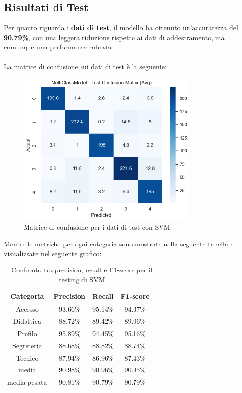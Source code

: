 \subsection{Risultati di Test}

Per quanto riguarda i \textbf{dati di test}, il modello ha ottenuto un'accuratezza del \textbf{90.79\%}, con una leggera riduzione rispetto ai dati di addestramento, ma comunque una performance robusta. \\ \\
La matrice di confusione sui dati di test è la seguente:

\begin{figure}[H]
    \centering
    \includegraphics[width=0.8\textwidth]{images/confusion_matrix_test_svm.png}
    \caption{Matrice di confusione per i dati di test con SVM}
    \label{fig:confusion_matrix_test_svm}
\end{figure}

Mentre le metriche per ogni categoria sono mostrate nella seguente tabella e visualizzate nel seguente grafico:

\begin{table}[H]
    \centering
    \begin{tabular}{|c|c|c|c|c|}
        \hline
        \textbf{Categoria} & \textbf{Precision} & \textbf{Recall} & \textbf{F1-score} \\
        \hline
        Accesso & 93.66\% & 95.14\% & 94.37\% \\
        \hline
        Didattica & 88.72\% & 89.42\% & 89.06\% \\
        \hline
        Profilo & 95.89\% & 94.45\% & 95.16\% \\
        \hline
        Segreteria & 88.68\% & 88.82\% & 88.74\% \\
        \hline
        Tecnico & 87.94\% & 86.96\% & 87.43\% \\
        \hline
        media & 90.98\% & 90.96\% & 90.95\% \\
        \hline
        media pesata & 90.81\% & 90.79\% & 90.79\% \\
        \hline
    \end{tabular}
    \caption{Confronto tra precision, recall e F1-score per il testing di SVM}
    \label{tab:metriche_svm_test}
\end{table}

